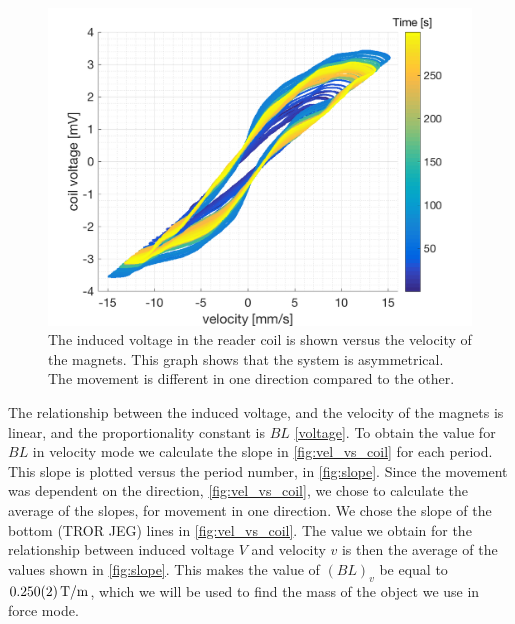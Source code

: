 \documentclass[english,a4paper,12pt,reprint]{revtex4-1}
\begin{document}
\begin{figure}[htpb]
    \centering
    \includegraphics[scale=0.44]{vel_vs_coil.png}
    \caption{The induced voltage in the reader coil is shown versus the velocity of the magnets. This graph shows that the system is asymmetrical. The movement is different in one direction compared to the other.}
    \label{fig:vel_vs_coil}
\end{figure}
The relationship between the induced voltage, and the velocity of the magnets is linear, and the proportionality constant is $BL$ \eqref{voltage}. To obtain the value for $BL$ in velocity mode we calculate the slope in \vref{fig:vel_vs_coil} for each period. This slope is plotted versus the period number, in \vref{fig:slope}. Since the movement was dependent on the direction, \vref{fig:vel_vs_coil}, we chose to calculate the average of the slopes, for movement in one direction. We chose the slope of the bottom (TROR JEG) lines in \vref{fig:vel_vs_coil}. The value we obtain for the relationship between induced voltage $V$ and velocity $v$ is then the average of the values shown in \vref{fig:slope}. This makes the value of $\left(BL\right)_v$ be equal to $\SI{0.250\pm0.002}{\tesla/\meter}$, which we will be used to find the mass of the object we use in force mode.
\end{document}
